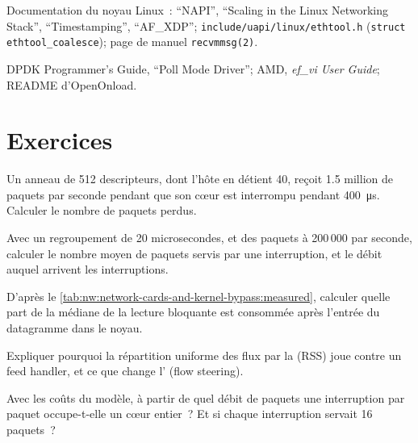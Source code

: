 \begin{omsources}
\item Documentation du noyau Linux~: ``NAPI'', ``Scaling in the Linux Networking Stack'', ``Timestamping'', ``AF\_XDP'';
\texttt{include/uapi/linux/ethtool.h} (\texttt{struct ethtool\_coalesce}); page de manuel \texttt{recvmmsg(2)}.
\item DPDK Programmer's Guide, ``Poll Mode Driver''; AMD, \emph{ef\_vi User Guide}; README d'OpenOnload.
\end{omsources}

\section{Exercices}

\begin{exercise}[$\star$]\label{exo:nw:network-cards-and-kernel-bypass:1}
Un anneau de 512 descripteurs, dont l'hôte en détient 40, reçoit 1.5 million de paquets par seconde pendant que son cœur est interrompu pendant
\qty{400}{\micro\second}. Calculer le nombre de paquets perdus.
\end{exercise}

\begin{exercise}[$\star$]\label{exo:nw:network-cards-and-kernel-bypass:2}
Avec un regroupement de 20 microsecondes, et des paquets à 200\,000 par seconde, calculer le nombre moyen de paquets servis par une interruption, et
le débit auquel arrivent les interruptions.
\end{exercise}

\begin{exercise}[$\star$]\label{exo:nw:network-cards-and-kernel-bypass:3}
D'après le \cref{tab:nw:network-cards-and-kernel-bypass:measured}, calculer quelle part de la médiane de la lecture bloquante est consommée après
l'entrée du datagramme dans le noyau.
\end{exercise}

\begin{exercise}[$\star\star$]\label{exo:nw:network-cards-and-kernel-bypass:4}
Expliquer pourquoi la répartition uniforme des flux par la  (RSS) joue contre un feed handler, et ce que change l' (flow steering).
\end{exercise}

\begin{exercise}[$\star\star$]\label{exo:nw:network-cards-and-kernel-bypass:5}
Avec les coûts du modèle, à partir de quel débit de paquets une interruption par paquet occupe-t-elle un cœur entier~? Et si chaque interruption servait 16 paquets~?
\end{exercise}

